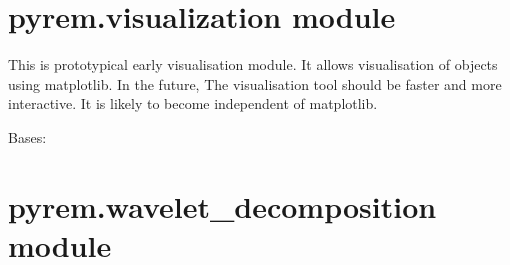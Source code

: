 \documentclass[letterpaper,10pt,english]{sphinxmanual}
\begin{document}
\section{pyrem.visualization module}
\label{pyrem.visualization:module-pyrem.visualization}\label{pyrem.visualization::doc}\label{pyrem.visualization:pyrem-visualization-module}
This is prototypical early visualisation module.
It allows visualisation of {\hyperref[pyrem.polygram:pyrem.polygram.Polygram]{}} objects using matplotlib.
In the future, The visualisation tool should be faster and more interactive.
It is likely to become independent of matplotlib.

\begin{fulllineitems}
\label{pyrem.visualization:pyrem.visualization.PolygramDisplay}
Bases: 

\begin{fulllineitems}
\label{pyrem.visualization:pyrem.visualization.PolygramDisplay.show}
\end{fulllineitems}


\end{fulllineitems}



\section{pyrem.wavelet\_decomposition module}
\label{pyrem.wavelet_decomposition::doc}\label{pyrem.wavelet_decomposition:module-pyrem.wavelet_decomposition}\label{pyrem.wavelet_decomposition:pyrem-wavelet-decomposition-module}
\end{document}
